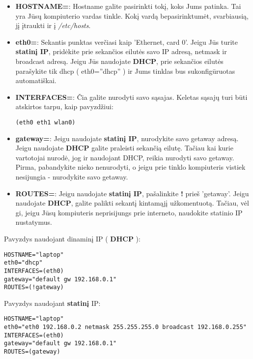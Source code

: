 \begin{itemize}
  \item \textbf{HOSTNAME=}: Hostname galite pasirinkti tokį, koks Jums
    patinka. Tai yra Jūsų kompiuterio vardas tinkle. Kokį vardą
    bepasirinktumėt, svarbiausią, jį įtraukti ir į
    \textsl{/etc/hosts}.
  \item \textbf{eth0=}: Sekantis punktas verčiasi kaip 'Ethernet, card
    0'. Jeigu Jūs turite \textbf{statinį IP}, pridėkite prie sekančios
    eilutės savo IP adresą, netmask ir broadcast adresą. Jeigu Jūs
    naudojate \textbf{DHCP}, prie sekančios eilutės parašykite tik
    dhcp ( eth0=''dhcp'' ) ir Jums tinklas bus sukonfigūruotas
    automatiškai.
  \item \textbf{INTERFACES=}: Čia galite nurodyti savo
    sąsajas. Keletas sąsajų turi būti atskirtos tarpu, kaip
    pavyzdžiui:
    \begin{verbatim}
(eth0 eth1 wlan0)
    \end{verbatim}
  \item \textbf{gateway=}: Jeigu naudojate \textbf{statinį IP},
    nurodykite savo getaway adresą. Jeigu naudojate \textbf{DHCP}
    galite praleisti sekančią eilutę. Tačiau kai kurie vartotojai
    nurodė, jog ir naudojant DHCP, reikia nurodyti savo
    getaway. Pirma, pabandykite nieko nenurodyti, o jeigu prie tinklo
    kompiuteris vistiek nesijungia - nurodykite savo getaway.
  \item \textbf{ROUTES=}: Jeigu naudojate \textbf{statinį IP},
    pašalinkite \textbf{!} prieš 'getaway'. Jeigu naudojate
    \textbf{DHCP}, galite palikti sekantį kintamąjį
    užkomentuotą. Tačiau, vėl gi, jeigu Jūsų kompiuteris neprisijungs
    prie interneto, naudokite statinio IP nustatymus. 
\end{itemize}

Pavyzdys naudojant dinaminį IP ( \textbf{DHCP} ):

\begin{verbatim}
HOSTNAME="laptop"
eth0="dhcp"
INTERFACES=(eth0)
gateway="default gw 192.168.0.1"
ROUTES=(!gateway)
\end{verbatim}

Pavyzdys naudojant \textbf{statinį} IP:

\begin{verbatim}
HOSTNAME="laptop"
eth0="eth0 192.168.0.2 netmask 255.255.255.0 broadcast 192.168.0.255"
INTERFACES=(eth0)
gateway="default gw 192.168.0.1"
ROUTES=(gateway)
\end{verbatim}

